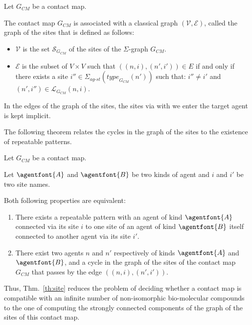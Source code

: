 \documentclass{entcs}
\newcommand{\graphsymb}{G}
\newcommand{\linksite}{\signaturesymb_{\textit{ag-st}}}
\newcommand{\signaturesymb}{\Sigma}
\newcommand{\type}[1][\graphsymb]{\textit{type}_{#1}}
\newcommand{\sites}[1][\graphsymb]{\mathcal{S}_{#1}}
\newcommand{\links}[1][\graphsymb]{\mathcal{L}_{#1}}
\begin{document}
\begin{defn}
  Let $\graphsymb_{\textit{CM}}$ be a contact map.

  The contact map $\graphsymb_{\textit{CM}}$ is associated with a classical graph $(\mathcal{V},\mathcal{E})$, called the graph of the sites that is defined as follows:
  \begin{itemize}
    \item $\mathcal{V}$ is the set $\sites[\graphsymb_{\textit{CM}}]$ of the sites of the $\Sigma$-graph $\graphsymb_{\textit{CM}}$.
    \item $\mathcal{E}$ is the subset of $V\times V$ such that
    $((n,i),(n',i'))\in E$ if and only if there exists a site
    $i''\in\linksite(\type[\graphsymb_{\textit{CM}}](n'))$ such that:
    $i'' \neq i'$ and $(n',i'')\in\links[\graphsymb_{\textit{CM}}](n,i)$.
  \end{itemize}
  \end{defn}

In the edges of the graph of the sites, the sites via with we enter the target agent is kept implicit.

The following theorem relates the cycles in the graph of the sites to the existence of repeatable patterns.

\begin{theorem}
  \label{th:site}
  Let $\graphsymb_{\textit{CM}}$ be a contact map.

Let $\agentfont{A}$ and $\agentfont{B}$ be two kinds of agent and
$i$ and $i'$ be two site names.

  Both following properties are equivalent:
  \begin{enumerate}
    \item There exists a repeatable pattern
    with an agent of kind $\agentfont{A}$ connected via its site $i$
    to one site of an agent of kind $\agentfont{B}$ itself connected to another agent via its site $i'$.
\item There exist two agents $n$ and $n'$ respectively of kinds $\agentfont{A}$
and  $\agentfont{B}$, and a  cycle in the graph of the sites of the contact map    $\graphsymb_{\textit{CM}}$  that passes by the edge $((n,i),(n',i'))$.
  \end{enumerate}
\end{theorem}

Thus, Thm.~\ref{th:site} reduces the problem of deciding whether
a contact map is compatible with an infinite number of non-isomorphic bio-molecular compounds to the one of computing the strongly connected components of the graph of the sites of this contact map.
\end{document}
